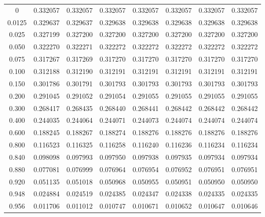 \begin{threeparttable}
\begin{tabular}{S[table-format=1.4] S[table-format=1.6] S[table-format=1.6] S[table-format=1.6] S[table-format=1.6] S[table-format=1.6] S[table-format=1.6] S[table-format=1.6]}
        0   &  0.332057   &  0.332057   &  0.332057   &  0.332057   &  0.332057   &  0.332057   &  0.332057   \\
        0.0125   &  0.329637   &  0.329637   &  0.329638   &  0.329638   &  0.329638   &  0.329638   &  0.329638   \\
        0.025   &  0.327199   &  0.327200   &  0.327200   &  0.327200   &  0.327200   &  0.327200   &  0.327200   \\
        0.050   &  0.322270   &  0.322271   &  0.322272   &  0.322272   &  0.322272   &  0.322272   &  0.322272   \\
        0.075   &  0.317267   &  0.317269   &  0.317270   &  0.317270   &  0.317270   &  0.317270   &  0.317270   \\
        0.100   &  0.312188   &  0.312190   &  0.312191   &  0.312191   &  0.312191   &  0.312191   &  0.312191   \\
        0.150   &  0.301786   &  0.301791   &  0.301793   &  0.301793   &  0.301793   &  0.301793   &  0.301793   \\
        0.200   &  0.291045   &  0.291052   &  0.291054   &  0.291055   &  0.291055   &  0.291055   &  0.291055   \\
        0.300   &  0.268417   &  0.268435   &  0.268440   &  0.268441   &  0.268442   &  0.268442   &  0.268442   \\
        0.400   &  0.244035   &  0.244064   &  0.244071   &  0.244073   &  0.244074   &  0.244074   &  0.244074   \\
        0.600   &  0.188245   &  0.188267   &  0.188274   &  0.188276   &  0.188276   &  0.188276   &  0.188276   \\
        0.800   &  0.116523   &  0.116325   &  0.116258   &  0.116240   &  0.116236   &  0.116234   &  0.116234   \\
        0.840   &  0.098098   &  0.097993   &  0.097950   &  0.097938   &  0.097935   &  0.097934   &  0.097934   \\
        0.880   &  0.077081   &  0.076999   &  0.076964   &  0.076954   &  0.076952   &  0.076951   &  0.076951   \\
        0.920   &  0.051135   &  0.051018   &  0.050968   &  0.050955   &  0.050951   &  0.050950   &  0.050950   \\
        0.948   &  0.024884   &  0.024519   &  0.024385   &  0.024347   &  0.024338   &  0.024335   &  0.024335   \\
        0.956   &  0.011706   &  0.011012   &  0.010747   &  0.010671   &  0.010652   &  0.010647   &  0.010646   \\

\end{tabular}
\end{threeparttable}
